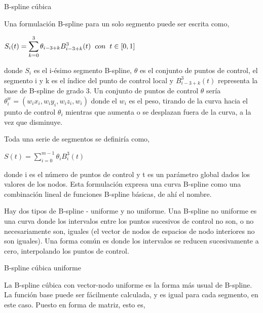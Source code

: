 B-spline c\'ubica

\hspace{0.4cm} Una formulaci\'on B-spline para un solo segmento puede ser escrita como,

\begin{center}
$\displaystyle{S_{i}(t) = \sum_{k=0}^{3} \theta_{i-3+k} B_{i-3+k}^{3}(t) \hspace{0.2cm} con \hspace{0.2cm} t \in [0,1]  }$
\end{center}


\noindent donde $S_{i}$ es el i-\'esimo segmento B-spline, $\theta$ es el conjunto de puntos de control, el segmento i y k es el \'indice del punto de control local y $ B_{i-3+k}^{3}(t)$ representa la base de B-spline de grado 3. Un conjunto de puntos de control $\theta$ ser\'ia  ${\displaystyle \theta_{i}^{w}=(w_{i}x_{i},w_{i}y_{i},w_{i}z_{i},w_{i})}$ donde el ${\displaystyle w_{i}}$ es el peso, tirando de la curva hacia el punto de control ${\displaystyle \theta_{i}}$ mientras que aumenta o se desplazan fuera de la curva, a la vez que disminuye.


\hspace{0.4cm} Toda una serie de segmentos se definir\'ia como,

\begin{center}
$\displaystyle{S(t) = \sum_{i=0}^{m-1} \theta_{i} B_{i}^{3}(t)  }$
\end{center}

\noindent donde i es el n\'umero de puntos de control y t es un par\'ametro global dados los valores de los nodos. Esta formulaci\'on expresa una curva B-spline como una combinaci\'on lineal de funciones B-spline b\'asicas, de ah\'i el nombre.

\hspace{0.4cm} Hay dos tipos de B-spline - uniforme y no uniforme. Una B-spline no uniforme es una curva donde los intervalos entre los puntos sucesivos de control no son, o no necesariamente son, iguales (el vector de nodos de espacios de nodo interiores no son iguales). Una forma com\'un es donde los intervalos se reducen sucesivamente a cero, interpolando los puntos de control.


B-spline c\'ubica uniforme

\hspace{0.4cm} La B-spline c\'ubica con vector-nodo uniforme es la forma m\'as usual de B-spline. La funci\'on base puede ser f\'acilmente calculada, y es igual para cada segmento, en este caso. Puesto en forma de matriz, esto es,


